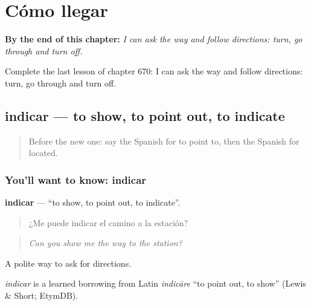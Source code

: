 
\chapter{Cómo llegar}
\label{ch:es-como-llegar}

\begin{chapteropening}
\textbf{By the end of this chapter:} \emph{I can ask the way and follow directions: turn, go through and turn off.}

Complete the last lesson of chapter 670: I can ask the way and follow directions: turn, go through and turn off.
\end{chapteropening}

\section[indicar]{indicar — to show, to point out, to indicate}

\label{lesson:ES-C670-indicar}



\begin{quote}
Before the new one: say the Spanish for to point to, then the Spanish for located.
\end{quote}

\subsection*{You'll want to know: indicar}
\textbf{indicar} — \textquotedblleft{}to show, to point out, to indicate\textquotedblright{}.

\begin{quote}
¿Me puede indicar el camino a la estación?
\end{quote}

\begin{quote}
\emph{Can you show me the way to the station?}
\end{quote}

A polite way to ask for directions.

\begin{cousinweb}
\emph{indicar} is a learned borrowing from Latin \emph{indicāre} \textquotedblleft{}to point out, to show\textquotedblright{} (Lewis \& Short; EtymDB).
\end{cousinweb}

